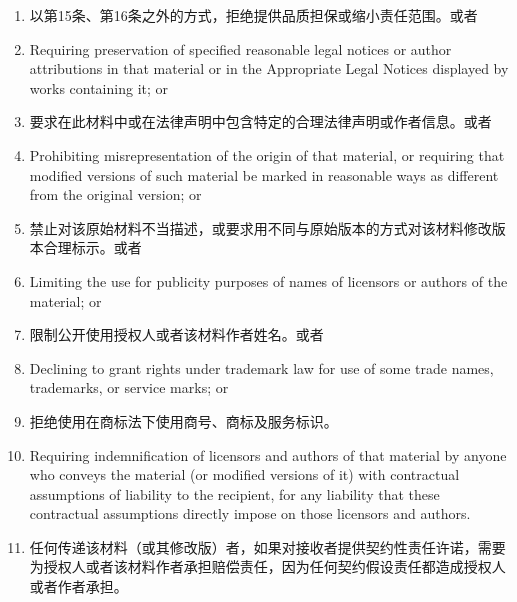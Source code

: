 \documentclass[11pt]{article}
\begin{document}
\begin{enumerate}
\begin{enumerate}
          \item 以第15条、第16条之外的方式，拒绝提供品质担保或缩小责任范围。或者

          \item Requiring preservation of specified reasonable legal notices or
                author attributions in that material or in the Appropriate Legal
                Notices displayed by works containing it; or

          \item 要求在此材料中或在法律声明中包含特定的合理法律声明或作者信息。或者

          \item Prohibiting misrepresentation of the origin of that material, or
                requiring that modified versions of such material be marked in
                reasonable ways as different from the original version; or

          \item 禁止对该原始材料不当描述，或要求用不同与原始版本的方式对该材料修改版本合理标示。或者

          \item Limiting the use for publicity purposes of names of licensors or
                authors of the material; or

          \item 限制公开使用授权人或者该材料作者姓名。或者

          \item Declining to grant rights under trademark law for use of some
                trade names, trademarks, or service marks; or

          \item 拒绝使用在商标法下使用商号、商标及服务标识。

          \item Requiring indemnification of licensors and authors of that
                material by anyone who conveys the material (or modified versions of
                it) with contractual assumptions of liability to the recipient, for
                any liability that these contractual assumptions directly impose on
                those licensors and authors.

          \item 任何传递该材料（或其修改版）者，如果对接收者提供契约性责任许诺，需要为授权人或者该材料作者承担赔偿责任，因为任何契约假设责任都造成授权人或者作者承担。

        \end{enumerate}


\end{enumerate}
\end{document}
